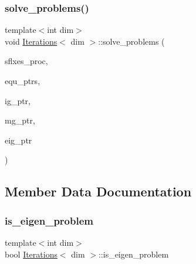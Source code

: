 \mbox{\label{class_iterations_ae41347e35b05b6f0fd3cb2a03ab60341}} 
\subsubsection{\texorpdfstring{solve\+\_\+problems()}{solve\_problems()}}
{\footnotesize\ttfamily template$<$int dim$>$ \\
void \hyperlink{class_iterations}{Iterations}$<$ dim $>$\+::solve\+\_\+problems (\begin{DoxyParamCaption}\item[{std\+::vector$<$ Vector$<$ double $>$ $>$ \&}]{sflxes\+\_\+proc,  }\item[{std\+::vector$<$ std\+\_\+cxx11\+::shared\+\_\+ptr$<$ \hyperlink{class_equation_base}{Equation\+Base}$<$ dim $>$ $>$ $>$ \&}]{equ\+\_\+ptrs,  }\item[{std\+\_\+cxx11\+::shared\+\_\+ptr$<$ \hyperlink{class_i_g_base}{I\+G\+Base}$<$ dim $>$ $>$}]{ig\+\_\+ptr,  }\item[{std\+\_\+cxx11\+::shared\+\_\+ptr$<$ \hyperlink{class_m_g_base}{M\+G\+Base}$<$ dim $>$ $>$}]{mg\+\_\+ptr,  }\item[{std\+\_\+cxx11\+::shared\+\_\+ptr$<$ \hyperlink{class_eigen_base}{Eigen\+Base}$<$ dim $>$ $>$}]{eig\+\_\+ptr }\end{DoxyParamCaption})}



\subsection{Member Data Documentation}
\mbox{\label{class_iterations_acfd49ecddab96b70fc271942b3173ad7}} 
\subsubsection{\texorpdfstring{is\+\_\+eigen\+\_\+problem}{is\_eigen\_problem}}
{\footnotesize\ttfamily template$<$int dim$>$ \\
bool \hyperlink{class_iterations}{Iterations}$<$ dim $>$\+::is\+\_\+eigen\+\_\+problem\hspace{0.3cm}{\ttfamily [private]}}

